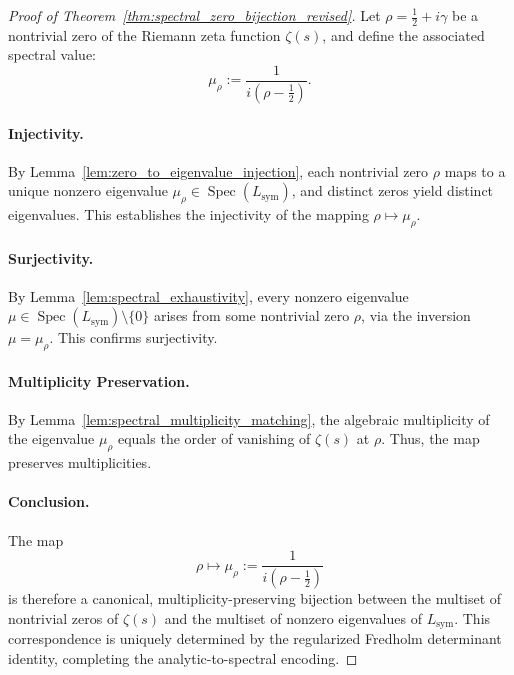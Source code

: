 \begin{proof}[Proof of Theorem~\ref{thm:spectral_zero_bijection_revised}]
Let \( \rho = \tfrac{1}{2} + i\gamma \) be a nontrivial zero of the Riemann zeta function \( \zeta(s) \), and define the associated spectral value:
\[
\mu_\rho := \frac{1}{i(\rho - \tfrac{1}{2})}.
\]

\paragraph{Injectivity.}
By Lemma~\ref{lem:zero_to_eigenvalue_injection}, each nontrivial zero \( \rho \) maps to a unique nonzero eigenvalue \( \mu_\rho \in \operatorname{Spec}(L_{\mathrm{sym}}) \), and distinct zeros yield distinct eigenvalues. This establishes the injectivity of the mapping \( \rho \mapsto \mu_\rho \).

\paragraph{Surjectivity.}
By Lemma~\ref{lem:spectral_exhaustivity}, every nonzero eigenvalue \( \mu \in \operatorname{Spec}(L_{\mathrm{sym}}) \setminus \{0\} \) arises from some nontrivial zero \( \rho \), via the inversion \( \mu = \mu_\rho \). This confirms surjectivity.

\paragraph{Multiplicity Preservation.}
By Lemma~\ref{lem:spectral_multiplicity_matching}, the algebraic multiplicity of the eigenvalue \( \mu_\rho \) equals the order of vanishing of \( \zeta(s) \) at \( \rho \). Thus, the map preserves multiplicities.

\paragraph{Conclusion.}
The map
\[
\rho \longmapsto \mu_\rho := \frac{1}{i(\rho - \tfrac{1}{2})}
\]
is therefore a canonical, multiplicity-preserving bijection between the multiset of nontrivial zeros of \( \zeta(s) \) and the multiset of nonzero eigenvalues of \( L_{\mathrm{sym}} \). This correspondence is uniquely determined by the regularized Fredholm determinant identity, completing the analytic-to-spectral encoding.
\end{proof}
% 